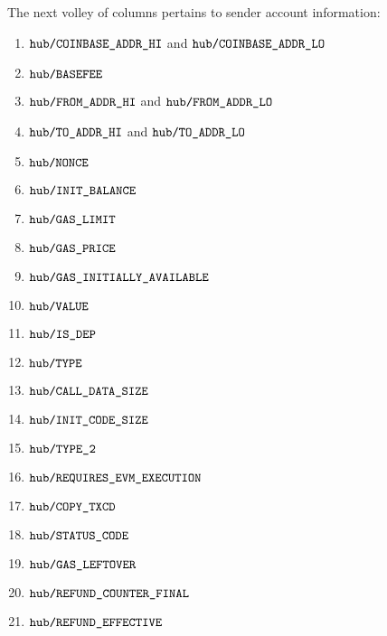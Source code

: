 The next volley of columns pertains to sender account information:
\begin{enumerate}
	\item
		\markAsExtractedFromBtc{}
		$\txnDataHubCoinbaseHi$ and
		$\txnDataHubCoinbaseLo$
	\item
		\markAsExtractedFromBtc{}
		$\txnDataHubBasefee$
	\item
		\markAsExtractedFromEcrecover{}
		$\txnDataHubFromHi$ and
		$\txnDataHubFromLo$
	\item
		\markAsSometimesExtractedFromRlpTxn{}
		$\txnDataHubToHi$ and
		$\txnDataHubToLo$
	\item
		\markAsExtractedFromHub{}
		$\txnDataHubNonce$
	\item
		\markAsExtractedFromHub{}
		$\txnDataHubInitialBalance$
	\item
		\markAsExtractedFromRlpTxn{}
		$\txnDataHubGasLimit$
	\item
		\markAsJustifiedHere{}
		$\txnDataHubGasPrice$
	\item
		\markAsJustifiedHere{}
		$\txnDataHubInitialGas$
	\item
		\markAsJustifiedHere{}
		$\txnDataHubValue$
	\item
		\markAsJustifiedHere{}
		$\txnDataHubIsDeployment$
	\item
		$\txnDataHubType$
	\item
		\markAsJustifiedHere{}
		$\txnDataHubCallDataSize$
	\item
		\markAsJustifiedHere{}
		$\txnDataHubInitCodeSize$
	\item
		$\txnDataHubIsTypeTwo$
	\item
		$\txnDataHubRequiresEvmExecution$
	\item
		$\txnDataHubCopyTxcd$
	\item
		\markAsExtractedFromHub{}
		\godGiven{}
		$\txnDataHubStatusCode$
	\item
		\markAsExtractedFromHub{}
		$\txnDataHubLeftoverGas$
	\item
		\markAsExtractedFromHub{}
		$\txnDataHubFinalRefundCounter$
	\item
		\markAsJustifiedHere{}
		$\txnDataHubEffectiveRefund$
\end{enumerate}

